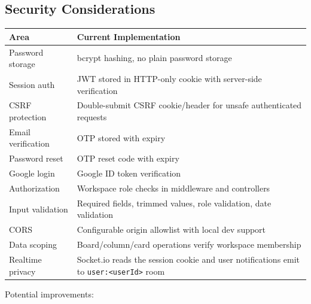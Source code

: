 \documentclass[
]{article}
\begin{document}
\subsection{Security Considerations}\label{security-considerations}

{\def\LTcaptype{} %
\begin{longtable}[]{@{}
  >{\raggedright\arraybackslash}p{}
  >{\raggedright\arraybackslash}p{}@{}}
\toprule\noalign{}
\begin{minipage}[b]{\linewidth}\raggedright
Area
\end{minipage} & \begin{minipage}[b]{\linewidth}\raggedright
Current Implementation
\end{minipage} \\
\midrule\noalign{}
\endhead
\bottomrule\noalign{}
\endlastfoot
Password storage & bcrypt hashing, no plain password storage \\
Session auth & JWT stored in HTTP-only cookie with server-side
verification \\
CSRF protection & Double-submit CSRF cookie/header for unsafe
authenticated requests \\
Email verification & OTP stored with expiry \\
Password reset & OTP reset code with expiry \\
Google login & Google ID token verification \\
Authorization & Workspace role checks in middleware and controllers \\
Input validation & Required fields, trimmed values, role validation,
date validation \\
CORS & Configurable origin allowlist with local dev support \\
Data scoping & Board/column/card operations verify workspace
membership \\
Realtime privacy & Socket.io reads the session cookie and user
notifications emit to \texttt{user:\textless{}userId\textgreater{}}
room \\
\end{longtable}
}

Potential improvements:
\end{document}
